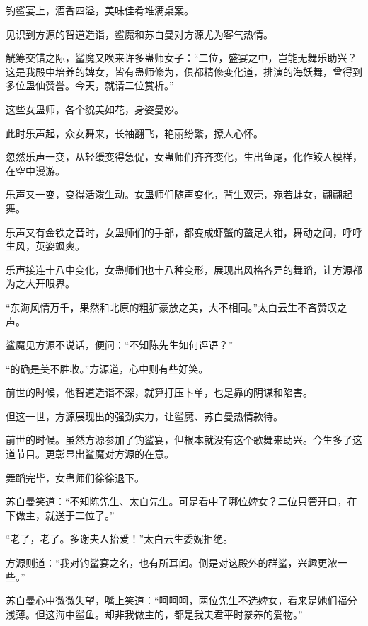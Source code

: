 
\begin{this_body}



钓鲨宴上，酒香四溢，美味佳肴堆满桌案。

见识到方源的智道造诣，鲨魔和苏白曼对方源尤为客气热情。

觥筹交错之际，鲨魔又唤来许多蛊师女子：“二位，盛宴之中，岂能无舞乐助兴？这是我殿中培养的婢女，皆有蛊师修为，俱都精修变化道，排演的海妖舞，曾得到多位蛊仙赞誉。今天，就请二位赏析。”

这些女蛊师，各个貌美如花，身姿曼妙。

此时乐声起，众女舞来，长袖翻飞，艳丽纷繁，撩人心怀。

忽然乐声一变，从轻缓变得急促，女蛊师们齐齐变化，生出鱼尾，化作鲛人模样，在空中漫游。

乐声又一变，变得活泼生动。女蛊师们随声变化，背生双壳，宛若蚌女，翩翩起舞。

乐声又有金铁之音时，女蛊师们的手部，都变成虾蟹的螯足大钳，舞动之间，呼呼生风，英姿飒爽。

乐声接连十八中变化，女蛊师们也十八种变形，展现出风格各异的舞蹈，让方源都为之大开眼界。

“东海风情万千，果然和北原的粗犷豪放之美，大不相同。”太白云生不吝赞叹之声。

鲨魔见方源不说话，便问：“不知陈先生如何评语？”

“的确是美不胜收。”方源道，心中则有些好笑。

前世的时候，他智道造诣不深，就算打压卜单，也是靠的阴谋和陷害。

但这一世，方源展现出的强劲实力，让鲨魔、苏白曼热情款待。

前世的时候。虽然方源参加了钓鲨宴，但根本就没有这个歌舞来助兴。今生多了这道节目。更彰显出鲨魔对方源的在意。

舞蹈完毕，女蛊师们徐徐退下。

苏白曼笑道：“不知陈先生、太白先生。可是看中了哪位婢女？二位只管开口，在下做主，就送于二位了。”

“老了，老了。多谢夫人抬爱！”太白云生委婉拒绝。

方源则道：“我对钓鲨宴之名，也有所耳闻。倒是对这殿外的群鲨，兴趣更浓一些。”

苏白曼心中微微失望，嘴上笑道：“呵呵呵，两位先生不选婢女，看来是她们福分浅薄。但这海中鲨鱼。却非我做主的，都是我夫君平时豢养的爱物。”


\end{this_body}
